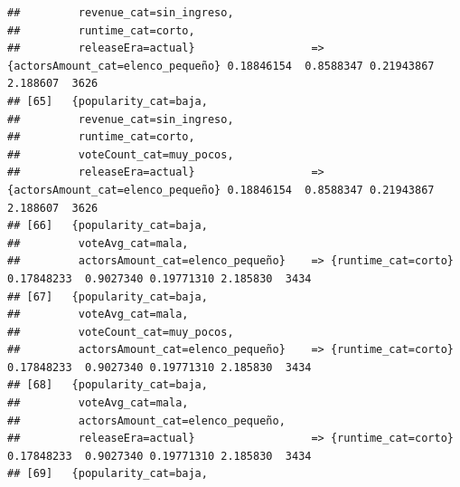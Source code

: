 \documentclass[
]{article}
\begin{document}
\begin{verbatim}
##         revenue_cat=sin_ingreso,                                                                                                
##         runtime_cat=corto,                                                                                                      
##         releaseEra=actual}                  => {actorsAmount_cat=elenco_pequeño} 0.18846154  0.8588347 0.21943867 2.188607  3626
## [65]   {popularity_cat=baja,                                                                                                    
##         revenue_cat=sin_ingreso,                                                                                                
##         runtime_cat=corto,                                                                                                      
##         voteCount_cat=muy_pocos,                                                                                                
##         releaseEra=actual}                  => {actorsAmount_cat=elenco_pequeño} 0.18846154  0.8588347 0.21943867 2.188607  3626
## [66]   {popularity_cat=baja,                                                                                                    
##         voteAvg_cat=mala,                                                                                                       
##         actorsAmount_cat=elenco_pequeño}    => {runtime_cat=corto}               0.17848233  0.9027340 0.19771310 2.185830  3434
## [67]   {popularity_cat=baja,                                                                                                    
##         voteAvg_cat=mala,                                                                                                       
##         voteCount_cat=muy_pocos,                                                                                                
##         actorsAmount_cat=elenco_pequeño}    => {runtime_cat=corto}               0.17848233  0.9027340 0.19771310 2.185830  3434
## [68]   {popularity_cat=baja,                                                                                                    
##         voteAvg_cat=mala,                                                                                                       
##         actorsAmount_cat=elenco_pequeño,                                                                                        
##         releaseEra=actual}                  => {runtime_cat=corto}               0.17848233  0.9027340 0.19771310 2.185830  3434
## [69]   {popularity_cat=baja,                                                                                                    

\end{verbatim}
\end{document}
